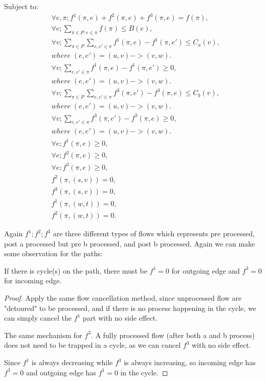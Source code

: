 \documentclass[twoside,leqno, 11pt]{article}
\begin{document}
Subject to:
\newline
\begin{subequations}
\begin{align}
&\forall e, \pi;  f^1(\pi, e) +f^2(\pi, e)+ f^3(\pi, e)= f(\pi),\\
&\forall e; \sum \limits_{\pi\in P:e\in \pi} f(\pi) \leq B(e),\\
&\forall  v; \sum \limits_{\pi\in P} \sum \limits_{ e,e'\in \pi} f^1(\pi, e) -f^1(\pi, e')\leq C_a(v),\\
& where \;(e, e') = (u,v)->(v,w).\nonumber\\
&\forall  v; \sum \limits_{ e,e'\in \pi} f^1(\pi, e) -f^1(\pi, e')\geq 0,\\
& where \;(e, e') = (u,v)->(v,w).\nonumber\\
&\forall  v; \sum \limits_{\pi\in P} \sum \limits_{ e,e'\in \pi} f^3(\pi, e') -f^3(\pi, e)\leq C_b(v),\\
& where \;(e, e') = (u,v)->(v,w).\nonumber\\
&\forall  v; \sum \limits_{ e,e'\in \pi} f^3(\pi, e') -f^3(\pi, e)\geq 0,\\
& where \;(e, e') = (u,v)->(v,w).\nonumber\\
&\forall e; f^1(\pi,e)\geq 0, \\
&\forall e; f^2(\pi,e)\geq 0, \\
&\forall e; f^3(\pi,e)\geq 0, \\
&f^2(\pi,(s,v))= 0, \\
&f^3(\pi,(s,v))= 0, \\
&f^1(\pi, (w,t)) =0, \\
&f^2(\pi, (w,t)) =0.
\end{align}
\end{subequations}

Again $f^1; f^2; f^3$ are three different types of flows which represents pre processed, post a processed but pre b processed, and post b processed. Again we can make some observation for the paths:

\begin{lemma}
If there is cycle(s) on the path, there must be $f^1=0 $ for outgoing edge and $f^3=0$ for incoming edge. 
\end{lemma}

\begin{proof}
Apply the same flow cancellation method, since unprocessed flow are "detoured" to be processed, and if there is no process happening in the cycle, we can simply cancel the $f^1$ part with no side effect.

The same mechanism for $f^3$. A fully processed flow (after both a and b process) does not need to be trapped in a cycle, as we can cancel $f^3$ with no side effect. 

Since $f^1$ is always decreasing while $f^3$ is always increasing, so incoming edge has $f^3=0$ and outgoing edge has $f^1=0$ in the cycle.
\end{proof}
\end{document}
